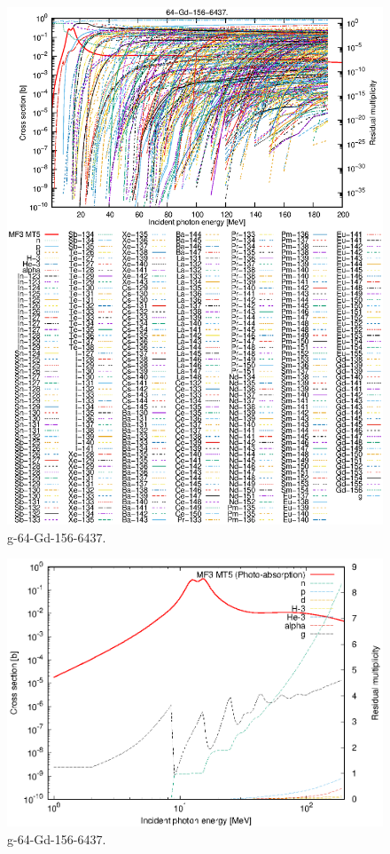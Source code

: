 \begin{figure}
 \includegraphics[width=\linewidth]{eps/g_64-Gd-156_6437.eps}
  \caption{g-64-Gd-156-6437.}
\end{figure}
\newpage \clearpage

\begin{figure}
 \includegraphics[width=\linewidth]{eps-log/g_64-Gd-156_6437.eps}
 \caption{g-64-Gd-156-6437.}
\end{figure}
\newpage \clearpage

